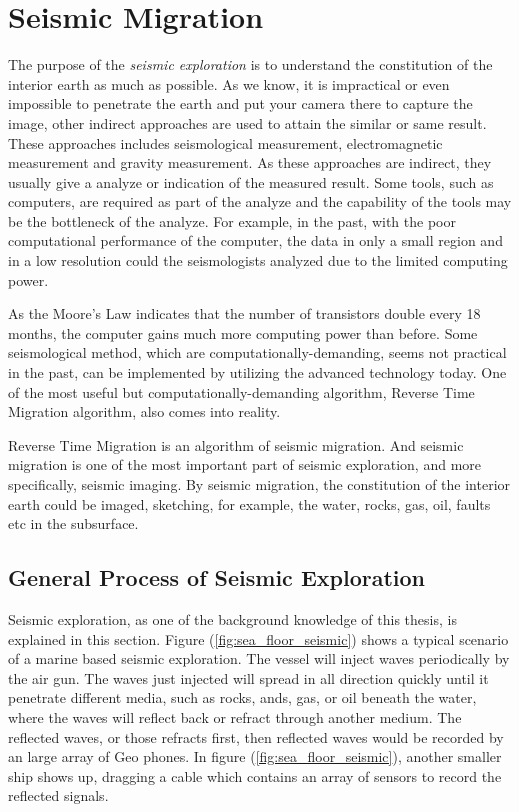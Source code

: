 \section{Seismic Migration}

The purpose of the \emph{seismic exploration} is to understand the
constitution of the interior earth as much as possible. As we know, it is
impractical or even impossible to penetrate the earth and put your camera
there to capture the image, other indirect approaches are used to attain
the similar or same result. These approaches includes seismological
measurement, electromagnetic measurement and gravity measurement. As these
approaches are indirect, they usually give a analyze or indication of the
measured result. Some tools, such as computers, are required as part of the
analyze and the capability of the tools may be the bottleneck of the
analyze. For example, in the past, with the poor computational performance
of the computer, the data in only a small region and in a low resolution
could the seismologists analyzed due to the limited computing power.

As the Moore's Law indicates that the number of transistors double every 18
months, the computer gains much more computing power than before. Some
seismological method, which are computationally-demanding, seems not
practical in the past, can be implemented by utilizing the advanced
technology today. One of the most useful but computationally-demanding
algorithm, Reverse Time Migration algorithm, also comes into reality.

Reverse Time Migration is an algorithm of seismic migration. And seismic
migration is one of the most important part of seismic exploration, and
more specifically, seismic imaging. By seismic migration, the constitution
of the interior earth could be imaged, sketching, for example, the water,
rocks, gas, oil, faults etc in the subsurface.

\subsection{General Process of Seismic Exploration}

Seismic exploration, as one of the background knowledge of this thesis,
is explained in this section. Figure (\ref{fig:sea_floor_seismic}) shows a
typical scenario of a marine
based seismic exploration. The vessel will inject waves periodically by the
air gun. The waves just injected will spread in all direction quickly until
it penetrate different media, such as rocks, ands, gas, or oil beneath the
water, where the waves will reflect back or refract through another medium.
The reflected waves, or those refracts first, then reflected waves would be
recorded by an large array of Geo phones. In figure
(\ref{fig:sea_floor_seismic}), another smaller ship shows up, dragging a
cable
which contains an array of sensors to record the reflected signals.

